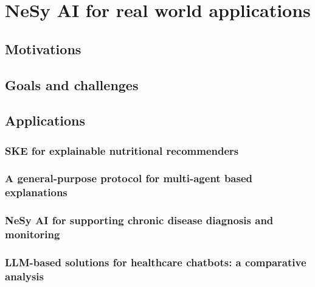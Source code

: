 
\chapter{NeSy AI for real world applications}
\label{ch:nesy-ai-for-real-world-applications}

\section{Motivations}\label{sec:nesy-ai-motivations}

\section{Goals and challenges}\label{sec:nesy-ai-goals-and-challenges}

\section{Applications}\label{sec:nesy-ai-applications}

\subsection{\Ac{SKE} for explainable nutritional recommenders}\label{subsec:ske-for-explainable-nutritional-recommenders}

\subsection{A general-purpose protocol for multi-agent based explanations}\label{subsec:a-general-purpose-protocol-for-multi-agent-based-explanations}

\subsection{\Acl{NeSy} \ac{AI} for supporting chronic disease diagnosis and monitoring}\label{subsec:nesy-ai-for-supporting-chronic-disease-diagnosis-and-monitoring}

\subsection{\Ac{LLM}-based solutions for healthcare chatbots: a comparative analysis}\label{subsec:llm-based-solutions-for-healthcare-chatbots-a-comparative-analysis}


